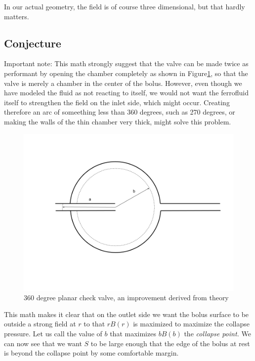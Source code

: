 \documentclass{asme2ej}
\begin{document}
In our actual geometry, the field is of course three dimensional,
but that hardly matters.



\subsection{Conjecture}

Important note: This math strongly suggest that the valve can be
made twice as performant by opening the chamber completely as shown in Figure\ref{fig:360}, so that the
valve is merely a chamber in the center of the bolus.
However, even though we have modeled the fluid as not reacting to itself,
we would not want the ferrofluid itself
to strengthen the field on the inlet side, which might occur. Creating
therefore an arc of someething less than 360 degrees, such as 270 degrees,
or making the walls of the thin chamber very thick, might solve this problem.
\begin{figure}[H]
\centerline{\includegraphics[width=6in]{figure/360degreeplanarcheckvalve.png}}
\caption{360 degree planar check valve, an improvement derived from theory}
\label{fig:360}
\end{figure}
This math makes it clear that on the outlet side we want the
bolus surface to be outside a strong field at $r$ to that $r B(r)$ is
maximized to maximize the collapse pressure.
Let us call the value of $b$ that maximizes $b B(b)$ the {\em collapse point.}
We can now see that we want $S$ to be large enough that the edge
of the bolus at rest is beyond the collapse point by some
comfortable margin.
\end{document}
